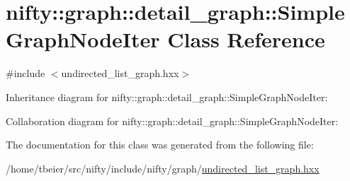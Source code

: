 \hypertarget{classnifty_1_1graph_1_1detail__graph_1_1SimpleGraphNodeIter}{}\section{nifty\+:\+:graph\+:\+:detail\+\_\+graph\+:\+:Simple\+Graph\+Node\+Iter Class Reference}
\label{classnifty_1_1graph_1_1detail__graph_1_1SimpleGraphNodeIter}


{\ttfamily \#include $<$undirected\+\_\+list\+\_\+graph.\+hxx$>$}



Inheritance diagram for nifty\+:\+:graph\+:\+:detail\+\_\+graph\+:\+:Simple\+Graph\+Node\+Iter\+:


Collaboration diagram for nifty\+:\+:graph\+:\+:detail\+\_\+graph\+:\+:Simple\+Graph\+Node\+Iter\+:


The documentation for this class was generated from the following file\+:\begin{DoxyCompactItemize}
\item 
/home/tbeier/src/nifty/include/nifty/graph/\hyperlink{graph_2undirected__list__graph_8hxx}{undirected\+\_\+list\+\_\+graph.\+hxx}\end{DoxyCompactItemize}
